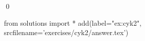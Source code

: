 
\begin{ex} 
  \label{ex:cyk2}
  
  \qed
\end{ex} 
\begin{python0}
from solutions import *
add(label="ex:cyk2",
    srcfilename='exercises/cyk2/answer.tex') 
\end{python0}
